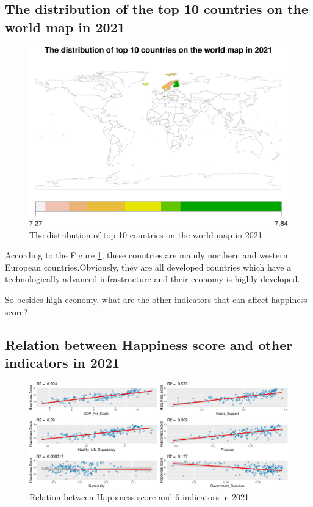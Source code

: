 \documentclass[11pt,a4paper,]{article}
\begin{document}
\hypertarget{the-distribution-of-the-top-10-countries-on-the-world-map-in-2021}{%
\subsection{The distribution of the top 10 countries on the world map in 2021}\label{the-distribution-of-the-top-10-countries-on-the-world-map-in-2021}}

\begin{figure}
\centering
\includegraphics{Assignment4_files/figure-latex/top10map-1.pdf}
\caption{\label{fig:top10map}The distribution of top 10 countries on the world map in 2021}
\end{figure}

According to the Figure \ref{fig:top10map}, these countries are mainly northern and western European countries.Obviously, they are all developed countries which have a technologically advanced infrastructure and their economy is highly developed.

So besides high economy, what are the other indicators that can affect happiness score?

\hypertarget{relation-between-happiness-score-and-other-indicators-in-2021}{%
\subsection{Relation between Happiness score and other indicators in 2021}\label{relation-between-happiness-score-and-other-indicators-in-2021}}

\begin{figure}
\centering
\includegraphics{Assignment4_files/figure-latex/relation-1.pdf}
\caption{\label{fig:relation}Relation between Happiness score and 6 indicators in 2021}
\end{figure}
\end{document}

